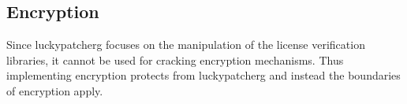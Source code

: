 \subsection{Encryption} \label{section:counter-replace-encryption}




Since \gls{luckypatcherg} focuses on the manipulation of the license verification libraries, it cannot be used for cracking encryption mechanisms.
Thus implementing encryption protects from \gls{luckypatcherg} and instead the boundaries of encryption apply.
